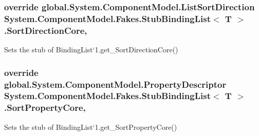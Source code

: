 \hypertarget{class_system_1_1_component_model_1_1_fakes_1_1_stub_binding_list_3_01_t_01_4_afbe273a88a6570596ee9350b34cd4d35}{
\subsubsection[{Sort\-Direction\-Core}]{\setlength{\rightskip}{0pt plus 5cm}override global.\-System.\-Component\-Model.\-List\-Sort\-Direction System.\-Component\-Model.\-Fakes.\-Stub\-Binding\-List$<$ T $>$.Sort\-Direction\-Core\hspace{0.3cm}{\ttfamily [get]}, {\ttfamily [protected]}}}\label{class_system_1_1_component_model_1_1_fakes_1_1_stub_binding_list_3_01_t_01_4_afbe273a88a6570596ee9350b34cd4d35}


Sets the stub of Binding\-List`1.get\-\_\-\-Sort\-Direction\-Core()

\hypertarget{class_system_1_1_component_model_1_1_fakes_1_1_stub_binding_list_3_01_t_01_4_afb31f4ffde044d55541dd46ecc44c931}{
\subsubsection[{Sort\-Property\-Core}]{\setlength{\rightskip}{0pt plus 5cm}override global.\-System.\-Component\-Model.\-Property\-Descriptor System.\-Component\-Model.\-Fakes.\-Stub\-Binding\-List$<$ T $>$.Sort\-Property\-Core\hspace{0.3cm}{\ttfamily [get]}, {\ttfamily [protected]}}}\label{class_system_1_1_component_model_1_1_fakes_1_1_stub_binding_list_3_01_t_01_4_afb31f4ffde044d55541dd46ecc44c931}


Sets the stub of Binding\-List`1.get\-\_\-\-Sort\-Property\-Core()


